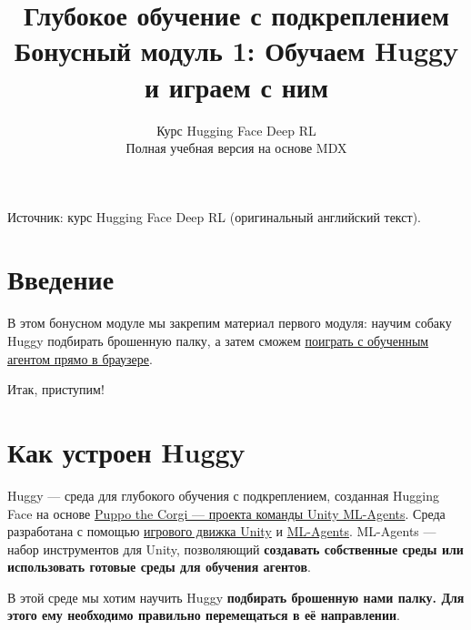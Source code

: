 \documentclass[11pt,a4paper]{article}
\title{\textbf{Глубокое обучение с подкреплением}\\[0.35em]\large Бонусный модуль 1: Обучаем Huggy и играем с ним}
\author{Курс Hugging Face Deep RL\\\small Полная учебная версия на основе MDX}
\date{}
\begin{document}
\selectfont
\maketitle
\vspace{-0.7em}
\begin{center}\small\color{secondary}Источник: курс Hugging Face Deep RL (оригинальный английский текст).\end{center}
\begingroup\small\setlength{\parskip}{0pt}\tableofcontents\endgroup
\vspace{0.5em}
\clearpage

\section{Введение}\label{introduction}

В этом бонусном модуле мы закрепим материал первого модуля: научим собаку Huggy подбирать брошенную палку, а затем сможем \href{https://huggingface.co/spaces/ThomasSimonini/Huggy}{поиграть с обученным агентом прямо в браузере}.


Итак, приступим!

\section{Как устроен Huggy}\label{how-huggy-works}

Huggy --- среда для глубокого обучения с подкреплением, созданная Hugging Face на основе \href{https://blog.unity.com/technology/puppo-the-corgi-cuteness-overload-with-the-unity-ml-agents-toolkit}{Puppo the Corgi --- проекта команды Unity ML-Agents}. Среда разработана с помощью \href{https://unity.com/}{игрового движка Unity} и \href{https://github.com/Unity-Technologies/ml-agents}{ML-Agents}. ML-Agents --- набор инструментов для Unity, позволяющий \textbf{создавать собственные среды или использовать готовые среды для обучения агентов}.


В этой среде мы хотим научить Huggy \textbf{подбирать брошенную нами палку. Для этого ему необходимо правильно перемещаться в её направлении}.
\end{document}
